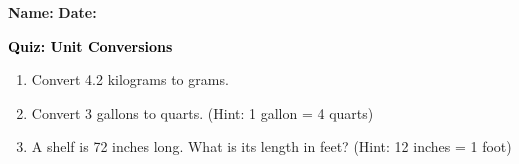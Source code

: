 \documentclass[12pt, letterpaper, fleqn]{article}
\begin{document}
\textbf{Name:} \underline{\hspace{5cm}}
\hfill
\textbf{Date:} \underline{\hspace{3cm}}\\

\begin{tcolorbox}[colback=customteal!20]
    \large\textcolor{black}{\textbf{Quiz: Unit Conversions}}
\end{tcolorbox}
\begin{enumerate}[itemsep=3.5cm, leftmargin=0.6cm]
\item Convert 4.2 kilograms to grams.
\vspace{3.5cm}
\item Convert 3 gallons to quarts. (Hint: 1 gallon = 4 quarts)
\vspace{3.5cm}
\item A shelf is 72 inches long. What is its length in feet? (Hint: 12 inches = 1 foot)
\end{enumerate}
\end{document}
